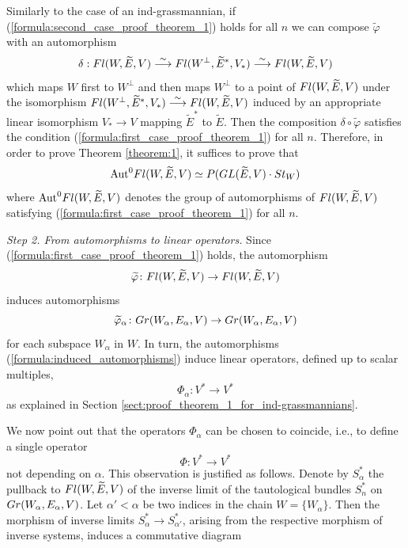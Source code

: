 \documentclass[11pt, a4paper]{article}
\begin{document}
Similarly to the case of an ind-grassmannian, if (\ref{formula:second_case_proof_theorem_1}) holds for all $n$ we can compose $\widetilde{\varphi}$ with an automorphism \begin{equation*}
    \delta: Fl(W,\widetilde{E},V) \stackrel{\sim}{\longrightarrow} Fl(W^{\perp},\widetilde{E}^*,V_*) \stackrel{\sim}{\longrightarrow} Fl(W,\widetilde{E},V)
\end{equation*}
which maps $W$ first to $W^{\perp}$ and then maps $W^{\perp}$ to a point of $Fl(W,\widetilde{E},V)$ under the isomorphism
    $ Fl(W^{\perp},\widetilde{E}^*,V_*) \stackrel{\sim}{\longrightarrow} Fl(W,\widetilde{E},V)$
induced by an appropriate linear isomorphism $V_*\rightarrow V$ mapping $\widetilde{E}^*$ to $\widetilde{E}$. Then the composition $\delta\circ\widetilde{\varphi}$ satisfies the condition (\ref{formula:first_case_proof_theorem_1}) for all $n$. Therefore, in order to prove Theorem \ref{theorem:1}, it suffices to prove that \begin{equation*}
    \mathrm{Aut}^0Fl(W,\widetilde{E},V)\simeq P(GL(\widetilde{E},V)\cdot St_W)
\end{equation*}
where $\mathrm{Aut}^0Fl(W,\widetilde{E},V)$ denotes the group of automorphisms of $Fl(W,\widetilde{E},V)$ satisfying (\ref{formula:first_case_proof_theorem_1}) for all $n$.

\emph{Step 2. From automorphisms to linear operators.} Since (\ref{formula:first_case_proof_theorem_1}) holds, the automorphism \begin{equation*}
    \widetilde{\varphi}\colon Fl(W,\widetilde{E},V) \rightarrow Fl(W,\widetilde{E},V)
\end{equation*} induces automorphisms \begin{equation}\label{formula:induced_automorphisms}
    \widetilde{\varphi}_{\alpha}\colon Gr(W_{\alpha},E_{\alpha},V)\rightarrow Gr(W_{\alpha},E_{\alpha},V)
\end{equation} 
for each subspace $W_{\alpha}$ in $W$. In turn, the automorphisms (\ref{formula:induced_automorphisms}) induce linear operators, defined up to scalar multiples, \begin{equation*}
    \Phi_{\alpha}:V^*\rightarrow V^*
\end{equation*}
as explained in Section \ref{sect:proof_theorem_1_for_ind-grassmannians}.

We now point out that the operators $\Phi_{\alpha}$ can be chosen to coincide, i.e., to define a single operator
\begin{equation*}
    \Phi:V^*\rightarrow V^*
\end{equation*}
not depending on $\alpha$. This observation is justified as follows. Denote by $S^*_{\alpha}$ the pullback to $Fl(W,\widetilde{E},V)$ of the inverse limit of the tautological bundles $S^*_{n}$ on $Gr(W_{\alpha},E_{\alpha},V)$. Let $\alpha'<\alpha$ be two indices in the chain $W=\{W_{\alpha}\}$. Then the morphism of inverse limits $S^*_{\alpha}\rightarrow S^*_{\alpha'}$, arising from the respective morphism of inverse systems, induces a commutative diagram
\end{document}
